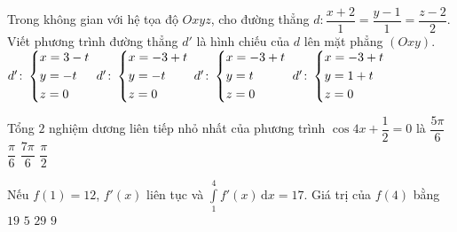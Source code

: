 \begin{ex}%
Trong không gian với hệ tọa độ $Oxyz$, cho đường thẳng $d\colon \dfrac{x + 2}{1} = \dfrac{y - 1}{1} = \dfrac{z - 2}{2}$. Viết phương trình đường thẳng $d'$ là hình chiếu của $d$ lên mặt phẳng $\left(Oxy\right)$.
\choice
{$d'\colon \left\{\begin{aligned}&x = 3 - t\\&y = - t\\&z = 0\end{aligned}\right.$}
{$d'\colon \left\{\begin{aligned}&x = - 3 + t\\&y = - t\\&z = 0\end{aligned}\right.$}
{\True $d'\colon \left\{\begin{aligned}&x = - 3 + t\\&y = t\\&z = 0\end{aligned}\right.$}
{$d'\colon \left\{\begin{aligned}&x = - 3 + t\\&y = 1 + t\\&z = 0\end{aligned}\right.$}
\end{ex}
\begin{ex}%
Tổng $2$ nghiệm dương liên tiếp nhỏ nhất của phương trình $\cos 4x + \dfrac{1}{2} = 0$ là
\choice
{$\dfrac{5\pi}{6}$}
{$\dfrac{\pi}{6}$}
{$\dfrac{7\pi}{6}$}
{\True $\dfrac{\pi}{2}$}
\end{ex}
\begin{ex}%
Nếu $f\left(1\right) = 12$, $f'\left(x\right)$ liên tục và $\displaystyle\int\limits_1^4 f'\left(x\right)\mathrm{\,d}x = 17$. Giá trị của $f\left(4\right)$ bằng
\choice
{$19$}
{$5$}
{\True $29$}
{$9$}
\end{ex}
